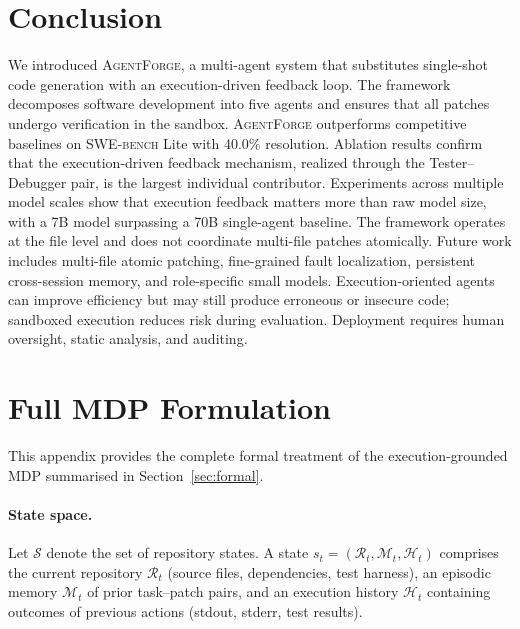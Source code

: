 \documentclass[journal]{IEEEtran}
\newcommand{\agentforge}{\textsc{AgentForge}}
\newcommand{\swebench}{\textsc{SWE-bench}}
\begin{document}

\section{Conclusion}
\label{sec:conclusion}
We introduced \agentforge{}, a multi-agent system that substitutes single-shot code generation with an execution-driven feedback loop. The framework decomposes software development into five agents and ensures that all patches undergo verification in the sandbox. \agentforge{} outperforms competitive baselines on \swebench{} Lite with 40.0\% resolution. Ablation results confirm that the execution-driven feedback mechanism, realized through the Tester--Debugger pair, is the largest individual contributor. Experiments across multiple model scales show that execution feedback matters more than raw model size, with a 7B model surpassing a 70B single-agent baseline. The framework operates at the file level and does not coordinate multi-file patches atomically. Future work includes multi-file atomic patching, fine-grained fault localization, persistent cross-session memory, and role-specific small models. Execution-oriented agents can improve efficiency but may still produce erroneous or insecure code; sandboxed execution reduces risk during evaluation. Deployment requires human oversight, static analysis, and auditing.


\appendix

\section{Full MDP Formulation}
\label{app:mdp}

This appendix provides the complete formal treatment of the execution-grounded MDP summarised in Section~\ref{sec:formal}.

\paragraph{State space.}
Let $\mathcal{S}$ denote the set of repository states. A state $s_t = (\mathcal{R}_t, \mathcal{M}_t, \mathcal{H}_t)$ comprises the current repository $\mathcal{R}_t$ (source files, dependencies, test harness), an episodic memory $\mathcal{M}_t$ of prior task--patch pairs, and an execution history $\mathcal{H}_t$ containing outcomes of previous actions (stdout, stderr, test results).
\end{document}
